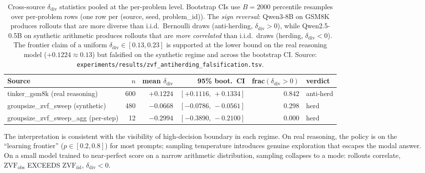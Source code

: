 \documentclass{article}
\begin{document}
\begin{table}[ht]
\centering
\small
\begin{tabular}{lrrrrl}
\toprule
Source & $n$ & mean $\delta_{\mathrm{div}}$ & 95\% boot.\ CI & frac$(\delta_{\mathrm{div}} > 0)$ & verdict \\
\midrule
tinker\_gsm8k (real reasoning)        & 600 & $+0.1224$ & $[+0.1116,\,+0.1334]$ & 0.842 & anti-herd \\
groupsize\_zvf\_sweep (synthetic)     & 480 & $-0.0668$ & $[-0.0786,\,-0.0561]$ & 0.298 & herd \\
groupsize\_zvf\_sweep\_agg (per-step) &  12 & $-0.2994$ & $[-0.3890,\,-0.2100]$ & 0.000 & herd \\
\bottomrule
\end{tabular}
\caption{Cross-source $\delta_{\mathrm{div}}$ statistics pooled at the
per-problem level. Bootstrap CIs use $B{=}2000$ percentile resamples
over per-problem rows (one row per (source, seed, problem\_id)). The
\emph{sign reversal}: Qwen3-8B on GSM8K produces rollouts that are
more diverse than i.i.d.\ Bernoulli draws (anti-herding, $\delta_{\mathrm{div}} > 0$),
while Qwen2.5-0.5B on synthetic arithmetic produces rollouts that
are \emph{more correlated} than i.i.d.\ draws (herding, $\delta_{\mathrm{div}} < 0$).
The frontier claim of a uniform $\delta_{\mathrm{div}} \in [0.13, 0.23]$
is supported at the lower bound on the real reasoning model
($+0.1224 \approx 0.13$) but falsified on the synthetic regime and
across the bootstrap CI.
Source: \texttt{experiments/results/zvf\_antiherding\_falsification.tsv}.
}
\label{tab:zvf-falsification}
\end{table}

The interpretation is consistent with the visibility of high-decision
boundary in each regime. On real reasoning, the policy is on the
``learning frontier'' ($p \in [0.2, 0.8]$) for most prompts; sampling
temperature introduces genuine exploration that escapes the modal
answer. On a small model trained to near-perfect score on a narrow
arithmetic distribution, sampling collapses to a mode: rollouts
correlate, $\mathrm{ZVF}_{\mathrm{obs}}$ EXCEEDS $\mathrm{ZVF}_{\mathrm{iid}}$,
$\delta_{\mathrm{div}} < 0$.
\end{document}
